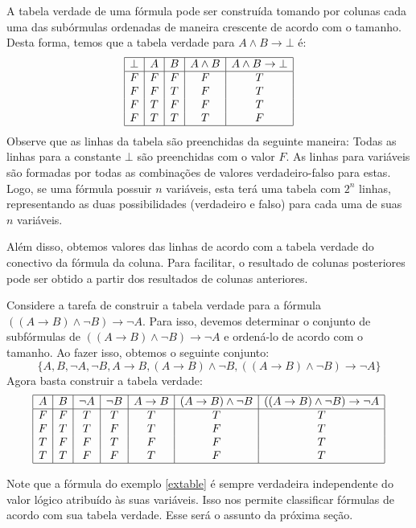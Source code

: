 A tabela verdade de uma f\'ormula pode ser constru\'ida tomando por
colunas cada uma das sub\'ormulas ordenadas de maneira crescente de
acordo com o tamanho. Desta forma, temos que a tabela verdade para
$A\land B\to \bot$ \'e:
\[
\begin{array}{|c|c|c|c|c|}
  \hline
  \bot & A & B & A\land B & A\land B \to \bot \\ \hline
   F     & F  & F &      F         &  T                            \\
   F     & F & T &       F         &   T                           \\
   F     & T & F &       F         &     T                         \\
   F     & T & T &       T         &      F                       \\ \hline
\end{array}
\]
Observe que as linhas da tabela s\~ao preenchidas da seguinte maneira:
Todas as linhas para a constante $\bot$ s\~ao preenchidas com o valor
$F$. As linhas para vari\'aveis s\~ao formadas por todas as
combina\c{c}\~oes de valores verdadeiro-falso para estas. Logo, se uma
f\'ormula possuir $n$ vari\'aveis, esta ter\'a uma tabela com $2^n$
linhas, representando as duas possibilidades (verdadeiro e falso) para
cada uma de suas $n$ vari\'aveis.

Al\'em disso, obtemos valores das linhas de acordo com a tabela
verdade do conectivo da f\'ormula da coluna. Para facilitar, o
resultado de colunas posteriores pode ser obtido a partir dos
resultados de colunas anteriores.

\begin{Example}\label{extable}
Considere a tarefa de construir a tabela verdade para a f\'ormula $((A
\to B)\land \neg B) \to \neg A$. Para isso, devemos determinar o conjunto de
subf\'ormulas de $((A\to B)\land \neg B) \to \neg A$ e orden\'a-lo de acordo
com o tamanho. Ao fazer isso, obtemos o seguinte conjunto:
\[
\{A,B,\neg A,\neg B,A\to B, (A\to B)\land \neg B,((A\to B)\land \neg
B)\to \neg A\}
\]
Agora basta construir a tabela verdade:
\[
\begin{array}{|c|c|c|c|c|c|c|}
  \hline
A & B & \neg A & \neg B & A \to B & (A \to B) \land \neg B & ((A\to
B)\land \neg B)\to \neg A\\ \hline
F & F &   T  & T & T & T & T\\
F & T &  T   & F & T  & F  & T\\
T & F &   F    &  T  &  F   & F  & T \\
T & T &   F    &  F  &  T   & F   & T \\ \hline
\end{array}
\]
\end{Example}
Note que a f\'ormula do exemplo \ref{extable} \'e sempre verdadeira
independente do valor l\'ogico atribu\'ido \`as suas vari\'aveis. Isso
nos permite classificar f\'ormulas de acordo com sua tabela
verdade. Esse ser\'a o assunto da pr\'oxima se\c{c}\~ao.

